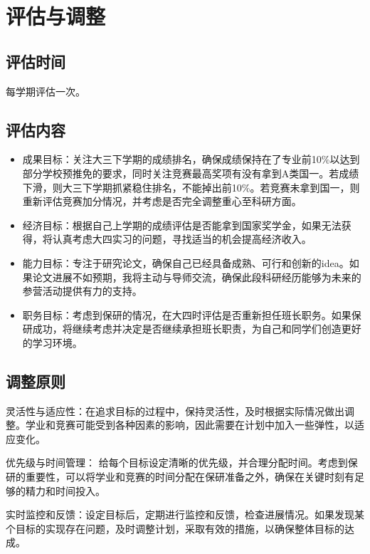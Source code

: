 \documentclass{article}
\begin{document}
\section{评估与调整}
\subsection{评估时间}
每学期评估一次。\par
\subsection{评估内容}
\begin{itemize}

\item 成果目标：关注大三下学期的成绩排名，确保成绩保持在了专业前10\%以达到部分学校预推免的要求，同时关注竞赛最高奖项有没有拿到A类国一。若成绩下滑，则大三下学期抓紧稳住排名，不能掉出前10\%。若竞赛未拿到国一，则重新评估竞赛加分情况，并考虑是否完全调整重心至科研方面。\par
\item 经济目标：根据自己上学期的成绩评估是否能拿到国家奖学金，如果无法获得，将认真考虑大四实习的问题，寻找适当的机会提高经济收入。\par
\item 能力目标：专注于研究论文，确保自己已经具备成熟、可行和创新的idea。如果论文进展不如预期，我将主动与导师交流，确保此段科研经历能够为未来的参营活动提供有力的支持。\par
\item 职务目标：考虑到保研的情况，在大四时评估是否重新担任班长职务。如果保研成功，将继续考虑并决定是否继续承担班长职责，为自己和同学们创造更好的学习环境。\par
	 
\end{itemize}
\subsection{调整原则}
灵活性与适应性：在追求目标的过程中，保持灵活性，及时根据实际情况做出调整。学业和竞赛可能受到各种因素的影响，因此需要在计划中加入一些弹性，以适应变化。

优先级与时间管理： 给每个目标设定清晰的优先级，并合理分配时间。考虑到保研的重要性，可以将学业和竞赛的时间分配在保研准备之外，确保在关键时刻有足够的精力和时间投入。

实时监控和反馈：设定目标后，定期进行监控和反馈，检查进展情况。如果发现某个目标的实现存在问题，及时调整计划，采取有效的措施，以确保整体目标的达成。
\end{document}
